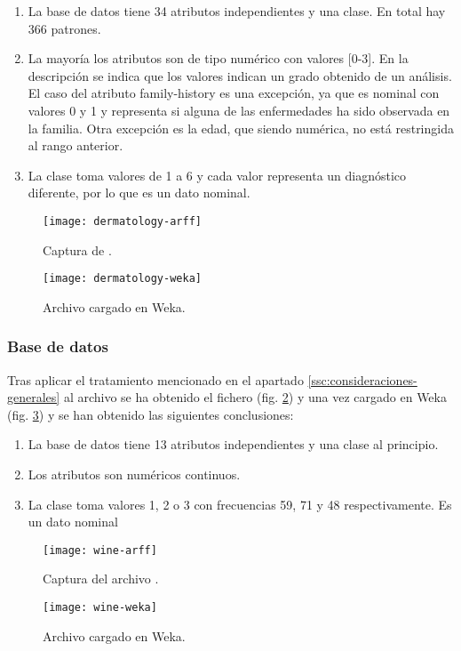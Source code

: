 \begin{enumerate}
    \item La base de datos tiene 34 atributos independientes y una clase. En total hay 366 patrones.
    \item La mayoría los atributos son de tipo numérico con valores [0-3]. En la descripción se indica que los valores indican un grado obtenido de un análisis. El caso del atributo family-history es una excepción, ya que es nominal con valores 0 y 1 y representa si alguna de las enfermedades ha sido observada en la familia. Otra excepción es la edad, que siendo numérica, no está restringida al rango anterior.
    \item La clase toma valores de 1 a 6 y cada valor representa un diagnóstico diferente, por lo que es un dato nominal.
\end{enumerate}
\begin{figure}[ht]
    \centering
    \begin{minipage}{0.45\textwidth}
        \centering
        \texttt{[image: dermatology-arff]}
        \caption{Captura de .}
        \label{fig:dermatology-arff}
    \end{minipage}\hfill
    \begin{minipage}{0.55\textwidth}
        \centering
        \texttt{[image: dermatology-weka]}
        \caption{Archivo  cargado en Weka.}
        \label{fig:dermatology-weka}
    \end{minipage}
\end{figure}


\subsubsection{Base de datos }
Tras aplicar el tratamiento mencionado en el apartado \ref{ssc:consideraciones-generales} al archivo  se ha obtenido el fichero  (fig. \ref{fig:wine-arff}) y una vez cargado en Weka (fig. \ref{fig:wine-weka}) y se han obtenido las siguientes conclusiones:

\begin{enumerate}
\item La base de datos tiene 13 atributos independientes y una clase al principio.
\item Los atributos son numéricos continuos.
\item La clase toma valores 1, 2 o 3 con frecuencias 59, 71 y 48 respectivamente. Es un dato nominal
\end{enumerate}
\begin{figure}[ht]
    \centering
    \texttt{[image: wine-arff]}
    \caption{Captura del archivo .}
    \label{fig:wine-arff}
\end{figure}
\begin{figure}[ht]
    \centering
    \texttt{[image: wine-weka]}
    \caption{Archivo  cargado en Weka.}
    \label{fig:wine-weka}
\end{figure}

